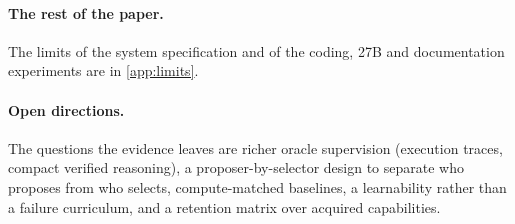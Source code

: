 \paragraph{The rest of the paper.} The limits of the system specification and of the coding, 27B and
documentation experiments are in \cref{app:limits}.

\paragraph{Open directions.} The questions the evidence leaves are richer oracle supervision (execution
traces, compact verified reasoning), a proposer-by-selector design to separate who proposes from who
selects, compute-matched baselines, a learnability rather than a failure curriculum, and a retention
matrix over acquired capabilities.
